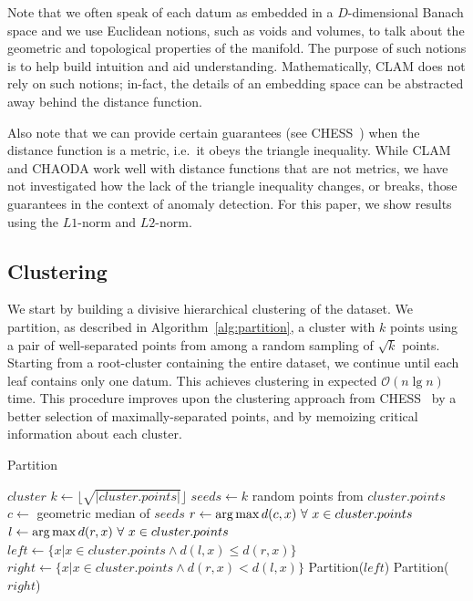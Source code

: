 Note that we often speak of each datum as embedded in a $D$-dimensional Banach space and we use Euclidean notions, such as voids and volumes, to talk about the geometric and topological properties of the manifold.
The purpose of such notions is to help build intuition and aid understanding.
Mathematically, CLAM does not rely on such notions; in-fact, the details of an embedding space can be abstracted away behind the distance function.

Also note that we can provide certain guarantees (see CHESS~\cite{ishaq2019clustered}) when the distance function is a metric, i.e.\ it obeys the triangle inequality.
While CLAM and CHAODA work well with distance functions that are not metrics, we have not investigated how the lack of the triangle inequality changes, or breaks, those guarantees in the context of anomaly detection.
For this paper, we show results using the $L1$-norm and $L2$-norm.


\subsection{Clustering}
\label{subsec:methods:clustering}

We start by building a divisive hierarchical clustering of the dataset.
We partition, as described in Algorithm~\ref{alg:partition}, a cluster with $k$ points using a pair of well-separated points from among a random sampling of $\sqrt k$ points.
Starting from a root-cluster containing the entire dataset, we continue until each leaf contains only one datum.
This achieves clustering in expected $\mathcal{O}(n \lg n)$ time.
This procedure improves upon the clustering approach from CHESS~\cite{ishaq2019clustered} by a better selection of maximally-separated points, and by memoizing critical information about each cluster.

\begin{algorithm} %
\caption{Partition} %
\label{alg:partition} %
\begin{algorithmic}[1] %
    \REQUIRE $cluster$
    \STATE $k \leftarrow \lfloor \sqrt{|cluster.points|} \rfloor$
    \STATE $seeds \leftarrow k$ random points from $cluster.points$
    \STATE $c \leftarrow$ geometric median of $seeds$
    \STATE $r \leftarrow \operatorname*{arg\,max} d(c,x) \ \forall \ x \in cluster.points$
    \STATE $l \leftarrow \operatorname*{arg\,max} d(r,x) \ \forall \ x \in cluster.points$
    \STATE $left \leftarrow \{x | x \in cluster.points \land d(l,x) \le d(r,x)\}$
    \STATE $right \leftarrow \{x | x \in cluster.points \land d(r,x) < d(l,x)\}$
        \STATE Partition($left$)
    \ENDIF
        \STATE Partition($right$)
    \ENDIF
\end{algorithmic}
\end{algorithm}


